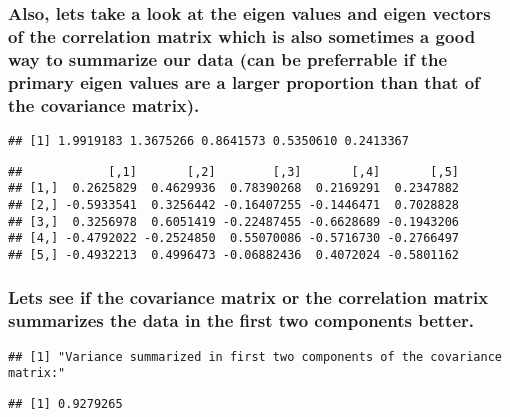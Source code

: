 \documentclass[]{article}
\begin{document}
\hypertarget{also-lets-take-a-look-at-the-eigen-values-and-eigen-vectors-of-the-correlation-matrix-which-is-also-sometimes-a-good-way-to-summarize-our-data-can-be-preferrable-if-the-primary-eigen-values-are-a-larger-proportion-than-that-of-the-covariance-matrix.}{%
\subsubsection{Also, lets take a look at the eigen values and eigen
vectors of the correlation matrix which is also sometimes a good way to
summarize our data (can be preferrable if the primary eigen values are a
larger proportion than that of the covariance
matrix).}\label{also-lets-take-a-look-at-the-eigen-values-and-eigen-vectors-of-the-correlation-matrix-which-is-also-sometimes-a-good-way-to-summarize-our-data-can-be-preferrable-if-the-primary-eigen-values-are-a-larger-proportion-than-that-of-the-covariance-matrix.}}

\begin{verbatim}
## [1] 1.9919183 1.3675266 0.8641573 0.5350610 0.2413367
\end{verbatim}

\begin{verbatim}
##            [,1]       [,2]        [,3]       [,4]       [,5]
## [1,]  0.2625829  0.4629936  0.78390268  0.2169291  0.2347882
## [2,] -0.5933541  0.3256442 -0.16407255 -0.1446471  0.7028828
## [3,]  0.3256978  0.6051419 -0.22487455 -0.6628689 -0.1943206
## [4,] -0.4792022 -0.2524850  0.55070086 -0.5716730 -0.2766497
## [5,] -0.4932213  0.4996473 -0.06882436  0.4072024 -0.5801162
\end{verbatim}

\hypertarget{lets-see-if-the-covariance-matrix-or-the-correlation-matrix-summarizes-the-data-in-the-first-two-components-better.}{%
\subsubsection{Lets see if the covariance matrix or the correlation
matrix summarizes the data in the first two components
better.}\label{lets-see-if-the-covariance-matrix-or-the-correlation-matrix-summarizes-the-data-in-the-first-two-components-better.}}

\begin{verbatim}
## [1] "Variance summarized in first two components of the covariance matrix:"
\end{verbatim}

\begin{verbatim}
## [1] 0.9279265
\end{verbatim}
\end{document}

